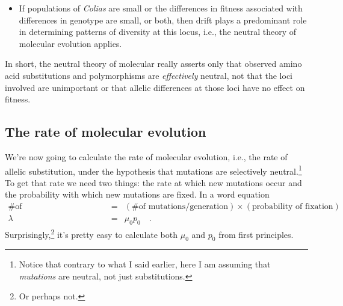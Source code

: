 \documentclass[12pt]{article}
\begin{document}
\begin{itemize}
\begin{itemize}
\item If populations of {\it Colias\/} are small or the differences in
  fitness associated with differences in genotype are small, or both,
  then drift plays a predominant role in determining patterns of
  diversity at this locus, i.e., the neutral theory of molecular
  evolution applies.

\end{itemize}

\end{itemize}

\noindent In short, the neutral theory of molecular really asserts
only that observed amino acid substitutions and polymorphisms are {\it
effectively\/} neutral, not that the loci involved are unimportant or
that allelic differences at those loci have no effect on
fitness.

\subsection*{The rate of molecular evolution}

We're now going to calculate the rate of molecular evolution, i.e.,
the rate of allelic substitution, under the hypothesis that mutations
are selectively neutral.\footnote{Notice that contrary to what I said
  earlier, here I am assuming that {\it mutations\/} are neutral, not
  just substitutions.} To get that rate we need two things: the rate
at which new mutations occur and the probability with which new
mutations are fixed. In a word equation
\begin{eqnarray*}
\mbox{\# of substitutions/generation} &=& (\mbox{\# of mutations/generation})\times(\mbox{probability
  of fixation}) \\
\lambda &=& \mu_0p_0 \quad .
\end{eqnarray*}
Surprisingly,\footnote{Or perhaps not.} it's pretty easy to calculate
both $\mu_0$ and $p_0$ from first principles.
\end{document}
